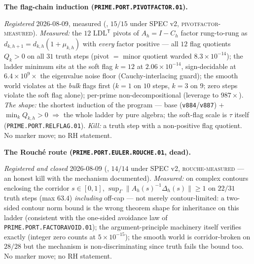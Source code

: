 \par\smallskip\noindent\textbf{The flag-chain induction
(\texttt{PRIME.PORT.\allowbreak PIVOTFACTOR.01}).}
{\sloppy
\emph{Registered} 2026-08-09, measured
(, $15/15$ under SPEC v2,
\textsc{pivotfactor-measured}).  \emph{Measured:} the $12$
LDL$^{\mathsf T}$ pivots of $A_h = I - C_h$ factor
rung-to-rung as $d_{k,h+1} = d_{k,h}(1 + \mu_{k,h})$ with
\emph{every} factor positive --- all $12$ flag quotients $Q_k
> 0$ on all $31$ truth steps (pivot $=$ minor quotient warded
$8.3\times10^{-14}$); the ladder minimum sits at the soft flag
$k = 12$ at $2.06\times10^{-14}$, sign-decidable at
$6.4\times10^{9}\times$ the eigenvalue noise floor
(Cauchy-interlacing guard); the smooth world violates at the
\emph{bulk} flags first ($k = 1$ on $10$ steps, $k = 3$ on
$9$; zero steps violate the soft flag alone); per-prime
non-decompositional (leverage to $987\times$).  \emph{The
shape:} the shortest induction of the program --- base
(\texttt{v884}/\texttt{v887}) $+$ $\min_k Q_{k,h} > 0$
$\Rightarrow$ the whole ladder by pure algebra; the soft-flag
scale is $\tau$ itself (\texttt{PRIME.PORT.RELFLAG.01}).
\emph{Kill:} a truth step with a non-positive flag quotient.
No marker move; no RH statement.\par}


\par\smallskip\noindent\textbf{The Rouch\'e route
(\texttt{PRIME.PORT.EULER.\allowbreak ROUCHE.01}, dead).}
{\sloppy
\emph{Registered and closed} 2026-08-09
(, $14/14$ under SPEC v2,
\textsc{rouche-measured} --- an honest kill with the mechanism
documented).  \emph{Measured:} on complex contours enclosing
the corridor $s \in [0, 1]$, $\sup_\Gamma
\|A_h(s)^{-1}\Delta_h(s)\| \ge 1$ on $22/31$ truth steps (max
$63.4$) \emph{including} off-cap --- not merely
contour-limited: a two-sided contour norm bound is the wrong
theorem shape for inheritance on this ladder (consistent with
the one-sided avoidance law of
\texttt{PRIME.PORT.FACTORAVOID.01}); the argument-principle
machinery itself verifies exactly (integer zero counts at
$5\times10^{-15}$); the smooth world is corridor-broken on
$28/28$ but the mechanism is non-discriminating since truth
fails the bound too.  No marker move; no RH statement.\par}


